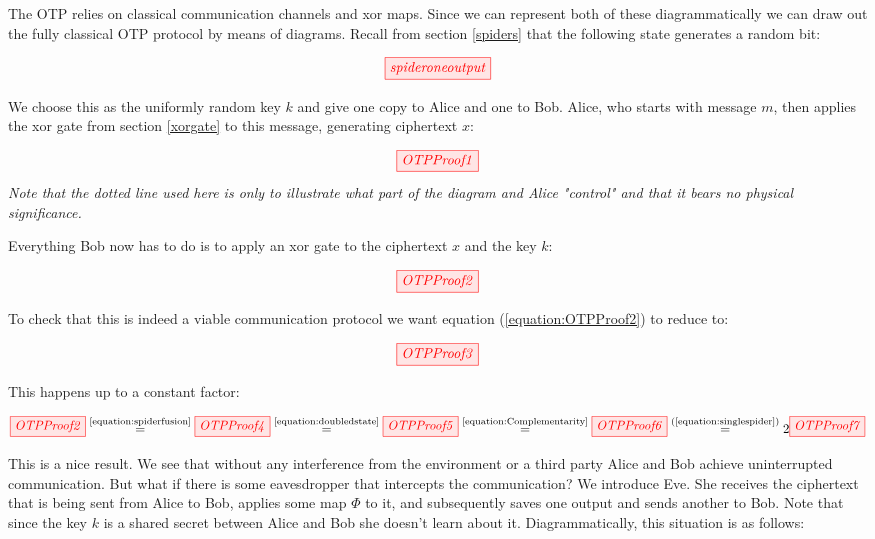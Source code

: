 \documentclass[]{article}
\newcommand{\equaltext}[1]{\ensuremath{\stackrel{\text{#1}}{=}}}
\begin{document}
The OTP relies on classical communication channels and xor maps. Since we can represent both of these diagrammatically we can draw out the fully classical OTP protocol by means of diagrams. Recall from section \ref{spiders} that the following state generates a random bit:

\begin{equation}
	\tikzfig{spideroneoutput}
\end{equation}

We choose this as the uniformly random key $k$ and give one copy to Alice and one to Bob. Alice, who starts with message $m$, then applies the xor gate from section \ref{xorgate} to this message, generating ciphertext $x$:

\begin{equation}
	\tikzfig{OTPProof1}
\end{equation}
\textit{Note that the dotted line used here is only to illustrate what part of the diagram and Alice "control" and that it bears no physical significance.}


Everything Bob now has to do is to apply an xor gate to the ciphertext $x$ and the key $k$:

\begin{equation}
\label{equation:OTPProof2}
\tikzfig{OTPProof2}
\end{equation}

To check that this is indeed a viable communication protocol we want equation (\ref{equation:OTPProof2}) to reduce to:

\begin{equation}
\label{equation:OTPProof3}
\tikzfig{OTPProof3}
\end{equation}

This happens up to a constant factor:

\begin{equation}
\label{equation:OTPProoflong}
\tikzfig{OTPProof2}\equaltext{\ref{equation:spiderfusion}} \tikzfig{OTPProof4} \equaltext{\ref{equation:doubledstate}} \tikzfig{OTPProof5} \equaltext{\ref{equation:Complementarity}} \tikzfig{OTPProof6} \equaltext{(\ref{equation:singlespider})} 2 \tikzfig{OTPProof7}
\end{equation}

This is a nice result. We see that without any interference from the environment or a third party Alice and Bob achieve uninterrupted communication. But what if there is some eavesdropper that intercepts the communication? We introduce Eve. She receives the ciphertext that is being sent from Alice to Bob, applies some map $\Phi$ to it, and subsequently saves one output and sends another to Bob. Note that since the key $k$ is a shared secret between Alice and Bob she doesn't learn about it. Diagrammatically, this situation is as follows:
\end{document}
